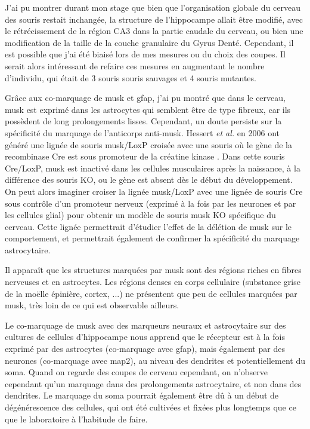 J'ai pu montrer durant mon stage que bien que l'organisation globale du cerveau des souris \mcrd restait inchangée, la structure de l'hippocampe allait être modifié, avec le rétrécissement de la région CA3 dans la partie caudale du cerveau, ou bien une modification de la taille de la couche granulaire du Gyrus Denté. Cependant, il est possible que j'ai été biaisé lors de mes mesures ou du choix des coupes. Il serait alors intéressant de refaire ces mesures en augmentant le nombre d'individu, qui était de 3 souris souris sauvages et 4 souris mutantes.

Grâce aux co-marquage de \gls{musk} et \gls{gfap}, j'ai pu montré que dans le cerveau, \gls{musk} est exprimé dans les astrocytes qui semblent être de type fibreux, car ils possèdent de long prolongements lisses. Cependant, un doute persiste sur la spécificité du marquage de l'anticorps anti-\gls{musk}. Hessert \emph{et al.} en 2006 ont généré une lignée de souris \gls{musk}/LoxP croisée avec une souris où le gène de la recombinase Cre est sous promoteur de la créatine kinase \cite{Hesser2006}. Dans cette souris Cre/LoxP, \gls{musk} est inactivé dans les cellules musculaires après la naissance, à la différence des souris KO, ou le gène est absent dès le début du développement. On peut alors imaginer croiser la lignée \gls{musk}/LoxP avec une lignée de souris Cre sous contrôle d'un promoteur nerveux (exprimé à la fois par les neurones et par les cellules glial) pour obtenir un modèle de souris \gls{musk} KO spécifique du cerveau. Cette lignée permettrait d'étudier l'effet de la délétion de \gls{musk} sur le comportement, et permettrait également de confirmer la spécificité du marquage astrocytaire.

Il apparaît que les structures marquées par \gls{musk} sont des régions riches en fibres nerveuses et en astrocytes. Les régions denses en corps cellulaire (substance grise de la moëlle épinière, cortex, ...) ne présentent que peu de cellules marquées par \gls{musk}, très loin de ce qui est observable ailleurs.

Le co-marquage de \gls{musk} avec des marqueurs neuraux et astrocytaire sur des cultures de cellules d'hippocampe nous apprend que le récepteur est à la fois exprimé par des astrocytes (co-marquage avec \gls{gfap}), mais également par des neurones (co-marquage avec \gls{map2}), au niveau des dendrites et potentiellement du soma. Quand on regarde des coupes de cerveau cependant, on n'observe cependant qu'un marquage dans des prolongements astrocytaire, et non dans des dendrites. Le marquage du soma pourrait également être dû à un début de dégénérescence des cellules, qui ont été cultivées et fixées plus longtemps que ce que le laboratoire à l'habitude de faire.

